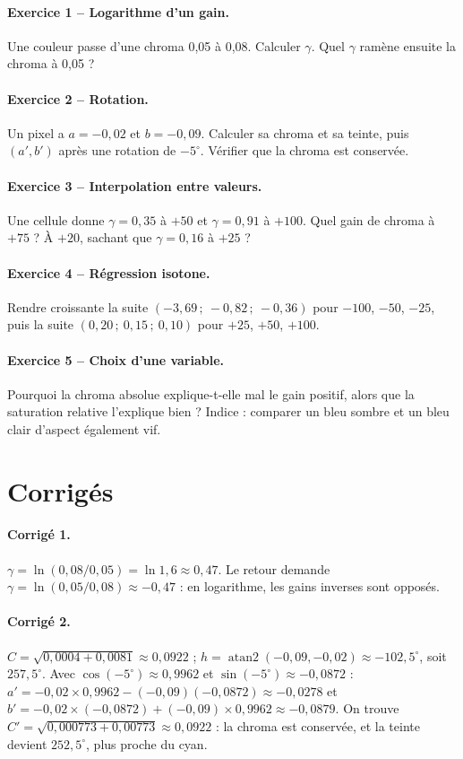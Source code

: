 \paragraph{Exercice 1 -- Logarithme d'un gain.} Une couleur passe d'une chroma
0,05 à 0,08. Calculer $\gamma$. Quel $\gamma$ ramène ensuite la chroma à 0,05 ?

\paragraph{Exercice 2 -- Rotation.} Un pixel a $a=-0{,}02$ et $b=-0{,}09$.
Calculer sa chroma et sa teinte, puis $(a',b')$ après une rotation de
$-5^\circ$. Vérifier que la chroma est conservée.

\paragraph{Exercice 3 -- Interpolation entre valeurs.} Une cellule donne
$\gamma=0{,}35$ à $+50$ et $\gamma=0{,}91$ à $+100$. Quel gain de chroma à
$+75$ ? À $+20$, sachant que $\gamma=0{,}16$ à $+25$ ?

\paragraph{Exercice 4 -- Régression isotone.} Rendre croissante la suite
$(-3{,}69\,;\ -0{,}82\,;\ -0{,}36)$ pour $-100$, $-50$, $-25$, puis la suite
$(0{,}20\,;\ 0{,}15\,;\ 0{,}10)$ pour $+25$, $+50$, $+100$.

\paragraph{Exercice 5 -- Choix d'une variable.} Pourquoi la chroma absolue
explique-t-elle mal le gain positif, alors que la saturation relative
l'explique bien ? Indice : comparer un bleu sombre et un bleu clair d'aspect
également vif.

\section{Corrigés}
\paragraph{Corrigé 1.} $\gamma=\ln(0{,}08/0{,}05)=\ln1{,}6\approx0{,}47$. Le
retour demande $\gamma=\ln(0{,}05/0{,}08)\approx-0{,}47$ : en logarithme, les
gains inverses sont opposés.

\paragraph{Corrigé 2.} $C=\sqrt{0{,}0004+0{,}0081}\approx0{,}0922$ ;
$h=\operatorname{atan2}(-0{,}09,-0{,}02)\approx-102{,}5^\circ$, soit
$257{,}5^\circ$. Avec $\cos(-5^\circ)\approx0{,}9962$ et
$\sin(-5^\circ)\approx-0{,}0872$ :
$a'=-0{,}02\times0{,}9962-(-0{,}09)(-0{,}0872)\approx-0{,}0278$ et
$b'=-0{,}02\times(-0{,}0872)+(-0{,}09)\times0{,}9962\approx-0{,}0879$.
On trouve $C'=\sqrt{0{,}000773+0{,}00773}\approx0{,}0922$ : la chroma est
conservée, et la teinte devient $252{,}5^\circ$, plus proche du cyan.

